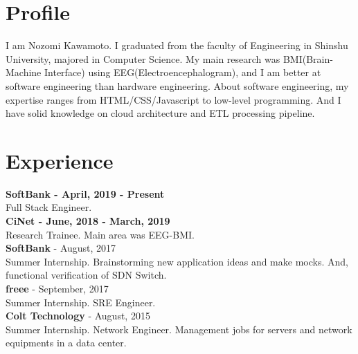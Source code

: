 \documentclass[11pt]{article} %
\begin{document}
\begin{paracol}{2}
\switchcolumn %

\section{Profile}
I am Nozomi Kawamoto. I graduated from the faculty of Engineering in Shinshu University, majored in Computer Science. 
My main research was BMI(Brain-Machine Interface) using EEG(Electroencephalogram), and I am better at software engineering than hardware engineering.
About software engineering, my expertise ranges from HTML/CSS/Javascript to low-level programming. And I have solid knowledge on cloud architecture and ETL processing pipeline. 

\vspace{1cm}

\section{Experience}
\textbf{\color{subtitle}SoftBank - April, 2019 - Present}\\
Full Stack Engineer.\\

\textbf{\color{subtitle}CiNet - June, 2018 - March, 2019}\\
Research Trainee. Main area was EEG-BMI.\\

\textbf{\color{subtitle}SoftBank}{\color{subtitle} - August, 2017}\\
Summer Internship. Brainstorming new application ideas and make mocks. And, functional verification of SDN Switch.\\

\textbf{\color{subtitle}freee}{\color{subtitle} - September, 2017}\\
Summer Internship. SRE Engineer.\\

\textbf{\color{subtitle}Colt Technology}{\color{subtitle} - August, 2015}\\
Summer Internship. Network Engineer. Management jobs for servers and network equipments in a data center.\\

\vspace{1cm}


\end{paracol}
\end{document}
